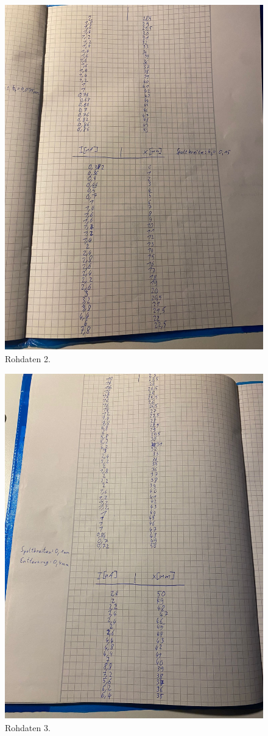 \begin{figure}[H]
  \includegraphics[width=\textwidth, height=15cm]{Bilder/rohdaten2.JPG}
  \caption{Rohdaten 2.}
\end{figure}

\begin{figure}[H]
  \includegraphics[width=\textwidth, height=15cm]{Bilder/rohdaten3.JPG}
  \caption{Rohdaten 3.}
\end{figure}



